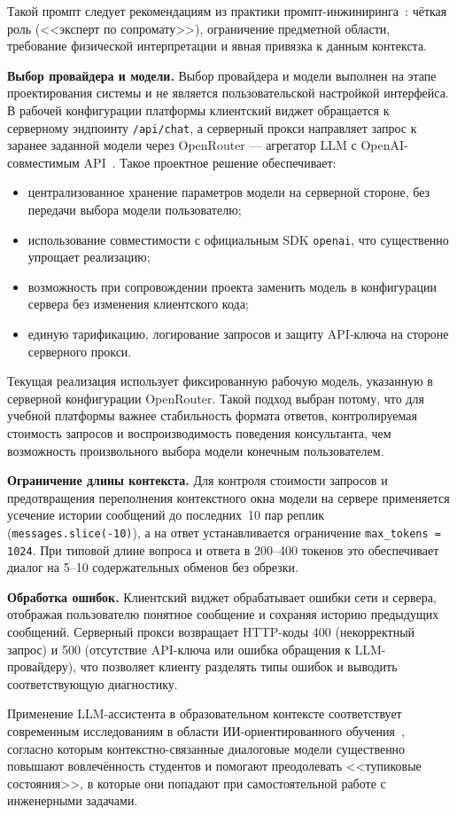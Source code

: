 Такой промпт следует рекомендациям из практики промпт-инжиниринга~\cite{white2023prompt, brown2020}: чёткая роль (<<эксперт по сопромату>>), ограничение предметной области, требование физической интерпретации и явная привязка к данным контекста.

\textbf{Выбор провайдера и модели.} Выбор провайдера и модели выполнен на этапе проектирования системы и не является пользовательской настройкой интерфейса. В рабочей конфигурации платформы клиентский виджет обращается к серверному эндпоинту \texttt{/api/chat}, а серверный прокси направляет запрос к заранее заданной модели через OpenRouter --- агрегатор LLM с OpenAI-совместимым API~\cite{openrouter}. Такое проектное решение обеспечивает:
\begin{itemize}
  \item централизованное хранение параметров модели на серверной стороне, без передачи выбора модели пользователю;
  \item использование совместимости с официальным SDK \texttt{openai}, что существенно упрощает реализацию;
  \item возможность при сопровождении проекта заменить модель в конфигурации сервера без изменения клиентского кода;
  \item единую тарификацию, логирование запросов и защиту API-ключа на стороне серверного прокси.
\end{itemize}

Текущая реализация использует фиксированную рабочую модель, указанную в серверной конфигурации OpenRouter. Такой подход выбран потому, что для учебной платформы важнее стабильность формата ответов, контролируемая стоимость запросов и воспроизводимость поведения консультанта, чем возможность произвольного выбора модели конечным пользователем.

\textbf{Ограничение длины контекста.} Для контроля стоимости запросов и предотвращения переполнения контекстного окна модели на сервере применяется усечение истории сообщений до последних~10 пар реплик (\texttt{messages.slice(-10)}), а на ответ устанавливается ограничение \texttt{max\_tokens = 1024}. При типовой длине вопроса и ответа в 200--400 токенов это обеспечивает диалог на 5--10 содержательных обменов без обрезки.

\textbf{Обработка ошибок.} Клиентский виджет обрабатывает ошибки сети и сервера, отображая пользователю понятное сообщение и сохраняя историю предыдущих сообщений. Серверный прокси возвращает HTTP-коды 400 (некорректный запрос) и 500 (отсутствие API-ключа или ошибка обращения к LLM-провайдеру), что позволяет клиенту разделять типы ошибок и выводить соответствующую диагностику.

Применение LLM-ассистента в образовательном контексте соответствует современным исследованиям в области ИИ-ориентированного обучения~\cite{kasneci2023chatgpt}, согласно которым контекстно-связанные диалоговые модели существенно повышают вовлечённость студентов и помогают преодолевать <<тупиковые состояния>>, в которые они попадают при самостоятельной работе с инженерными задачами.






